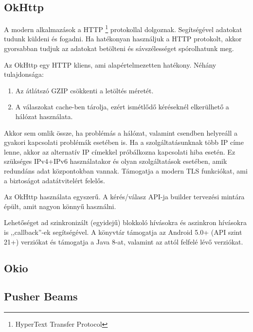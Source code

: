 \documentclass{thesis-ekf}
\theoremstyle{definition}
\theoremstyle{remark}
\begin{document}

\subsection{OkHttp}

A modern alkalmazások a HTTP \footnote{HyperText Transfer Protocol} protokollal dolgoznak. 
Segítségével adatokat tudunk küldeni és fogadni.
Ha hatékonyan használjuk a HTTP protokolt, akkor gyorsabban tudjuk az adatokat betölteni és sávszélességet spórolhatunk meg. 

Az OkHttp egy HTTP kliens, ami alapértelmezetten hatékony. Néhány tulajdonsága:

\begin{enumerate}
	\item Az átlátszó GZIP csökkenti a letöltés méretét.
	\item A válaszokat cache-ben tárolja, ezért ismétlődő kéréseknél elkerülhető a hálózat használata.
	
\end{enumerate}

Akkor sem omlik össze, ha problémás a hálózat, valamint csendben helyreáll a gyakori kapcsolati problémák esetében is.
Ha a szolgáltatásunknak több IP címe lenne, akkor az alternatív IP címekkel próbálkozna kapcsolati hiba esetén.
Ez szükséges IPv4+IPv6 használatakor és olyan szolgáltatások esetében, amik redundáns adat központokban vannak.
Támogatja a modern TLS funkciókat, ami a biztoságot adatátvitelért felelős.

Az OkHttp használata egyszerű. A kérés/válasz API-ja builder tervezési mintára épült, amit nagyon könnyű használni.

Lehetőséget ad szinkronizált (egyidejű) blokkoló hívásokra és aszinkron hívásokra is ,,callback''-ek segítségével.
A könyvtár támogatja az Android 5.0+ (API szint 21+) verziókat és támogatja a Java 8-at, valamint az attól felfelé lévő verziókat.


\subsection{Okio}

\subsection{Pusher Beams}
\end{document}
